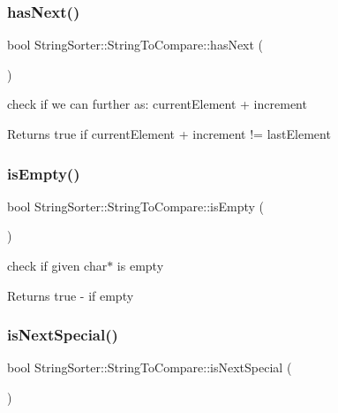 \subsubsection{\texorpdfstring{has\+Next()}{hasNext()}}
{\footnotesize\ttfamily bool String\+Sorter\+::\+String\+To\+Compare\+::has\+Next (\begin{DoxyParamCaption}{ }\end{DoxyParamCaption})}

check if we can further as\+: current\+Element + increment \begin{DoxyReturn}{Returns}
true if current\+Element + increment != last\+Element 
\end{DoxyReturn}
\mbox{\label{classStringSorter_1_1StringToCompare_a6bbaa86a9cea9bb61a9740431ddfcd50}} 
\subsubsection{\texorpdfstring{is\+Empty()}{isEmpty()}}
{\footnotesize\ttfamily bool String\+Sorter\+::\+String\+To\+Compare\+::is\+Empty (\begin{DoxyParamCaption}{ }\end{DoxyParamCaption})}

check if given char$\ast$ is empty \begin{DoxyReturn}{Returns}
true -\/ if empty 
\end{DoxyReturn}
\mbox{\label{classStringSorter_1_1StringToCompare_a28fb2f53c09c94445aa06c66cb102b7f}} 
\subsubsection{\texorpdfstring{is\+Next\+Special()}{isNextSpecial()}}
{\footnotesize\ttfamily bool String\+Sorter\+::\+String\+To\+Compare\+::is\+Next\+Special (\begin{DoxyParamCaption}{ }\end{DoxyParamCaption})}

